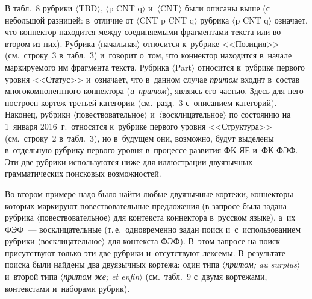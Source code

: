 \begin{multicols}{2}
  В табл.~8 рубрики $\langle$TBD$\rangle$, $\langle$p CNT q$\rangle$
  и~$\langle$CNT$\rangle$ были 
описаны выше (с небольшой разницей: в~отличие от $\langle$CNT p CNT q$\rangle$ 
рубрика $\langle$p CNT q$\rangle$ означает, что коннектор находится между 
соединяемыми фрагментами текста или во втором из них). Руб\-ри\-ка 
$\langle$начальная$\rangle$ относится к~рубрике <<Позиция>> (см.\ строку~3 
в~табл.~3) и~говорит о~том, что коннектор находится в~начале маркируемого 
им фрагмента текста. Рубрика $\langle$Part$\rangle$ относится к~рубрике первого 
уровня <<Статус>> и~означает, что в~данном случае \textit{притом} входит 
в~состав многокомпонентного коннектора (\textit{и~притом}), являясь его 
частью. Здесь для него построен кортеж третьей категории (см.\ разд.~3 
с~описанием категорий). Наконец, рубрики $\langle$повествовательное$\rangle$ 
и~$\langle$восклицательное$\rangle$ по состоянию на 1~января 2016~г.\ относятся 
к~руб\-ри\-ке первого уровня <<Структура>> (см.\ строку~2 в~табл.~3), но 
в~будущем они, возможно, будут выделены в~отдельную рубрику первого 
уровня в~процессе развития ФК ЯЕ и~ФК ФЭФ. Эти две рубрики 
используются ниже для иллюстрации двуязычных грамматических 
поисковых возможностей.
  
  Во втором примере надо было найти любые двуязычные кортежи, 
коннекторы которых маркируют повествовательные предложения (в запросе 
была задана рубрика $\langle$повествовательное$\rangle$ для контекс\-та коннектора 
в~русском языке), а~их ФЭФ~--- восклицательные (т.\,е.\ одновременно задан 
поиск и~с~использовани\-ем рубрики $\langle$восклицательное$\rangle$ для контекста 
ФЭФ). В~этом запросе на поиск присутствуют только эти две рубрики 
и~отсутствуют лексемы. В~результате поиска были найдены два двуязычных 
кортежа: один типа $\langle$\textit{притом; au surplus}$\rangle$ и~второй типа 
$\langle$\textit{притом же; et enfin}$\rangle$ (см.\ табл.~9 с~двумя кортежами, 
контекстами и~наборами руб\-рик).

  \begin{table*}\small %
  \begin{center}
   \vspace*{2ex}
   

\end{center}
\end{table*}
\end{multicols}
